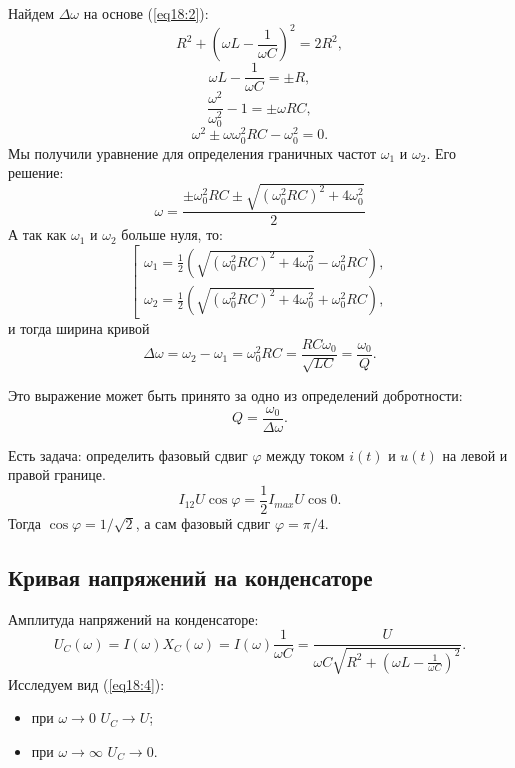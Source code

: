         Найдем \( \Delta\omega \) на основе (\ref{eq18:2}):
        \[
            R^2 + \left(\omega L -\frac{1}{\omega C}\right)^2 = 2R^2,
        \]
        \[
            \omega L - \frac{1}{\omega C} = \pm R,
        \]
        \[
            \frac{\omega^2}{\omega_0^2} - 1 = \pm\omega RC,
        \]
        \[
            \omega^2 \pm \omega\omega_0^2RC - \omega_0^2 = 0.
        \]
        Мы получили уравнение для определения граничных частот \( \omega_1 \) и
        \( \omega_2 \). Его решение:
        \[
            \omega = \frac{\pm\omega_0^2RC \pm
            \sqrt{(\omega_0^2RC)^2 + 4\omega_0^2}}{2}
        \]
        А так как \( \omega_1 \) и \( \omega_2 \) больше нуля, то:
        \[
            \left[
            \begin{array}{l}
                \omega_1 = \frac{1}{2}\left(\sqrt{(\omega_0^2RC)^2 +
                4\omega_0^2} - \omega_0^2RC\right), \\
                \omega_2 = \frac{1}{2}\left(\sqrt{(\omega_0^2RC)^2 +
                4\omega_0^2} + \omega_0^2RC\right),
            \end{array}
            \right.
        \]
        и тогда ширина кривой
        \[
            \Delta\omega = \omega_2 - \omega_1 = \omega_0^2RC =
            \frac{RC\omega_0}{\sqrt{LC}} = \frac{\omega_0}{Q}.
        \]
        
        \begin{remark}
            Это выражение может быть принято за одно из определений добротности:
            \[
                Q = \frac{\omega_0}{\Delta\omega}.
            \]
        \end{remark}
        
        \begin{remark}
            Есть задача: определить фазовый сдвиг \( \varphi \) между током
            \( i(t) \) и \( u(t) \) на левой и правой границе.
            \[
                I_{12}U\cos\varphi = \frac{1}{2}I_{{max}}U\cos0.
            \]
             Тогда \( \cos\varphi = 1/\sqrt{2} \), а сам фазовый сдвиг
             \( \varphi = \pi/4 \).
        \end{remark}
    
    \subsection{Кривая напряжений на конденсаторе}

        Амплитуда напряжений на конденсаторе:
        \begin{equation}
            U_C(\omega) = I(\omega)X_C(\omega) = I(\omega)\frac{1}{\omega C} =
            \frac{U}{\omega C \sqrt{R^2 + \left(\omega L -
            \frac{1}{\omega C}\right)^2}}.
            \label{eq18:4}
        \end{equation}
        Исследуем вид (\ref{eq18:4}):
        \begin{itemize}
            \item при \( \omega \to 0 \) \( U_C \to U \);
            \item при \( \omega \to \infty \) \( U_C \to 0 \).
        \end{itemize}
        
